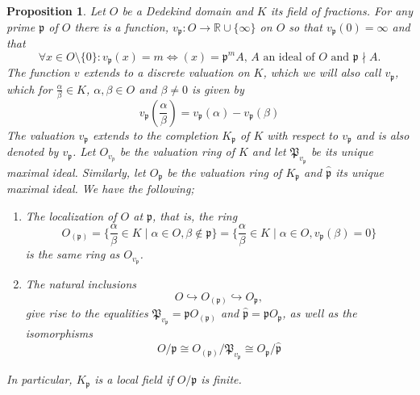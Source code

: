 \documentclass{article}
\newtheorem{proposition}{Proposition}[section]
\newcommand{\mfrak}[1]{\mathfrak{#1}}
\newcommand{\mbb}[1]{\mathbb{#1}}
\newcommand{\vp}{{v_{\mfrak p}}}
\begin{document}
\begin{proposition} \label{prop: Valuations on Dedekin domains}
    Let $O$ be a Dedekind domain and $K$ its field of fractions. For any prime $\mfrak p$ of $O$ there is a function, $\vp : O \to \mbb R \cup \{\infty \}$ on $O$ so that $\vp(0) = \infty$ and that
    \begin{equation}\label{eq: valuation}
        \forall x \in O\setminus \{0 \}: \vp(x) = m \iff (x) = \mfrak p^m A \text{, $A$ an ideal of $O$ and $\mfrak p \nmid A$}. 
    \end{equation}
    The function $v$ extends to a discrete valuation on $K$, which we will also call $\vp$, which for $\frac{\alpha}{\beta} \in K$, $\alpha,\beta \in O$ and $\beta \neq 0$ is given by %
    $$v_\mfrak{p}(\frac{\alpha}{\beta}) = v_\mfrak{p}(\alpha) - v_\mfrak{p}(\beta)$$
    The valuation $v_\mfrak{p}$ extends to the completion $K_\mfrak{p}$ of $K$ with respect to $v_\mfrak{p}$ and is also denoted by $v_\mfrak{p}$. Let $O_{v_p}$ be the valuation ring of $K$ and let $\mfrak{P}_{v_\mfrak{p}}$ be its unique maximal ideal. Similarly, let $O_\mfrak{p}$ be the valuation ring of $K_\mfrak{p}$ and $\hat{\mfrak{p}}$ its unique maximal ideal. We have the following;
    
    \begin{enumerate}
        \item The localization of $O$ at $\mfrak p$, that is, the ring 
        $$O_{(\mfrak p)} = \{\frac{\alpha}{\beta} \in K \mid \alpha \in O, \beta \notin \mfrak p\} =  \{\frac{\alpha}{\beta} \in K \mid \alpha \in O, \vp(\beta) = 0 \}$$
        is the same ring as $O_{\vp}$.
        \item The natural inclusions
        $$O \hookrightarrow O_{(\mfrak p)} \hookrightarrow O_\mfrak p,$$
        give rise to the equalities $\mfrak P_\vp = \mfrak p O_{(\mfrak p)}$ and $\hat {\mfrak p }= \mfrak p O_{\mfrak p}$, as well as the isomorphisms
        $$
        O / \mfrak{p} \cong O_{(\mfrak{p})} / \mfrak{P}_{v_{\mfrak{p}}} \cong O_{\mfrak{p}} / \hat{\mfrak{p}}
        $$

    \end{enumerate}
    In particular, $K_\mfrak p$ is a local field if $O / \mfrak{p}$ is finite.
      
    
    
    
\end{proposition}
\end{document}

